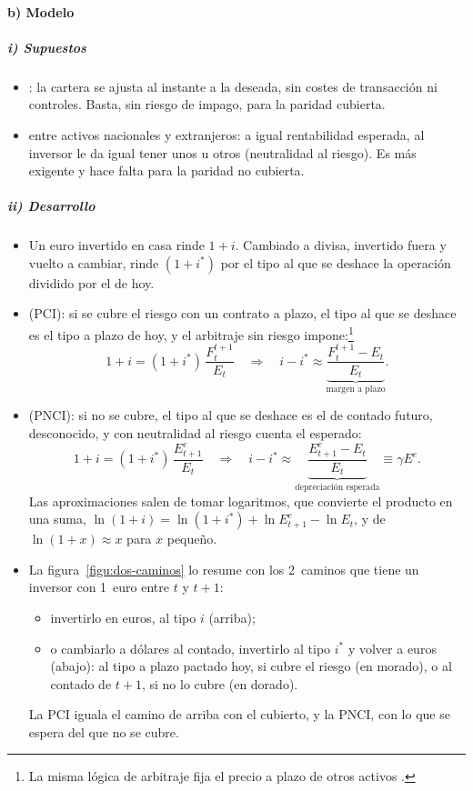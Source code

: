 \documentclass[11pt]{article}
\begin{document}
\paragraph{b) Modelo}
\subparagraph{i) Supuestos}
\begin{itemize}
\item {}: la cartera se ajusta al instante a la deseada, sin costes de transacción ni controles. Basta, sin riesgo de impago, para la paridad cubierta.
\item {} entre activos nacionales y extranjeros: a igual rentabilidad esperada, al inversor le da igual tener unos u otros (neutralidad al riesgo). Es más exigente y hace falta para la paridad no cubierta.
\end{itemize}

\subparagraph{ii) Desarrollo}
\begin{itemize}
\item Un euro invertido en casa rinde $1+i$. Cambiado a divisa, invertido fuera y vuelto a cambiar, rinde $(1+i^*)$ por el tipo al que se deshace la operación dividido por el de hoy.
\item {} (PCI): si se cubre el riesgo con un contrato a plazo, el tipo al que se deshace es el tipo a plazo de hoy, y el arbitraje sin riesgo impone:\footnote{La misma lógica de arbitraje fija el precio a plazo de otros activos  .}
  \begin{equation}\label{eq:pci}
  1+i=(1+i^{*})\,\frac{F_t^{t+1}}{E_t}\quad\Longrightarrow\quad i-i^{*}\approx\underbrace{\frac{F_t^{t+1}-E_t}{E_t}}_{\text{margen a plazo}} .
  \end{equation}
\item {} (PNCI): si no se cubre, el tipo al que se deshace es el de contado futuro, desconocido, y con neutralidad al riesgo cuenta el esperado:
  \begin{equation}\label{eq:pnci}
  1+i=(1+i^{*})\,\frac{E^e_{t+1}}{E_t}\quad\Longrightarrow\quad i-i^{*}\approx\underbrace{\frac{E^e_{t+1}-E_t}{E_t}}_{\text{depreciación esperada}}\equiv\gamma E^e .
  \end{equation}
  Las aproximaciones salen de tomar logaritmos, que convierte el producto en una suma, $\ln(1+i)=\ln(1+i^*)+\ln E^e_{t+1}-\ln E_t$, y de $\ln(1+x)\approx x$ para $x$ pequeño.
\item La figura~\ref{figu:dos-caminos} lo resume con los 2~caminos que tiene un inversor con 1~euro entre $t$ y $t+1$:
  \begin{itemize}
  \item invertirlo en euros, al tipo $i$ (arriba);
  \item o cambiarlo a dólares al contado, invertirlo al tipo $i^*$ y volver a euros (abajo): al tipo a plazo pactado hoy, si cubre el riesgo (en morado), o al contado de $t+1$, si no lo cubre (en dorado).
  \end{itemize}
  La PCI iguala el camino de arriba con el cubierto, y la PNCI, con lo que se espera del que no se cubre.
\end{itemize}
\end{document}
